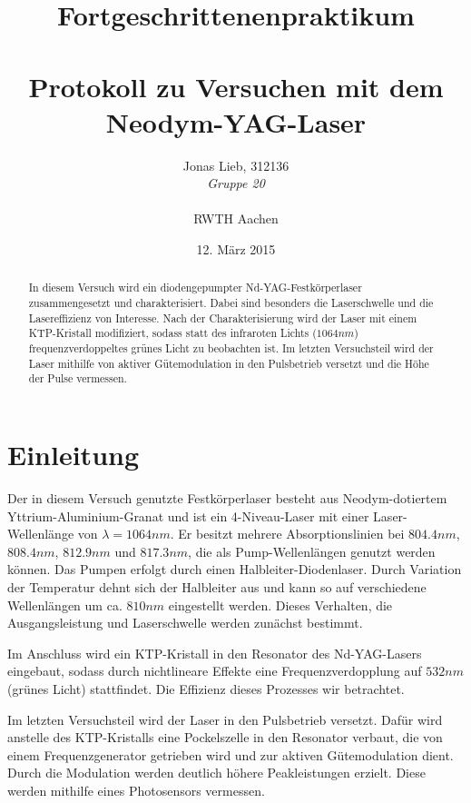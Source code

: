 \documentclass{../Misc/MontavonLaTeX/Montavon}
\date{12. März 2015}
\begin{document}
\title{Fortgeschrittenenpraktikum \\ \quad \\ Protokoll zu Versuchen mit dem Neodym-YAG-Laser}
\author{Jonas Lieb, 312136 \\ \emph{Gruppe 20} \\ \\  RWTH Aachen}
\maketitle

\begin{abstract}
In diesem Versuch wird ein diodengepumpter Nd-YAG-Festkörperlaser zusammengesetzt und charakterisiert. Dabei sind besonders die Laserschwelle und die Lasereffizienz von Interesse. Nach der Charakterisierung wird der Laser mit einem KTP-Kristall modifiziert, sodass statt des infraroten Lichts ($1064 \unit{nm}$) frequenzverdoppeltes grünes Licht zu beobachten ist. Im letzten Versuchsteil wird der Laser mithilfe von aktiver Gütemodulation in den Pulsbetrieb versetzt und die Höhe der Pulse vermessen.
\end{abstract}
\newpage

\setcounter{tocdepth}{2}
\tableofcontents
\newpage

\section{Einleitung}
Der in diesem Versuch genutzte Festkörperlaser besteht aus Neodym-dotiertem Yttrium-Aluminium-Granat und ist ein 4-Niveau-Laser mit einer Laser-Wellenlänge von $\lambda = 1064 \unit{nm}$. Er besitzt mehrere Absorptionslinien bei $804.4 \unit{nm}$, $808.4 \unit{nm}$, $812.9 \unit{nm}$ und $817.3 \unit{nm}$, die als Pump-Wellenlängen genutzt werden können.
Das Pumpen erfolgt durch einen Halbleiter-Diodenlaser. Durch Variation der Temperatur dehnt sich der Halbleiter aus und kann so auf verschiedene Wellenlängen um ca. $810 \unit{nm}$ eingestellt werden. Dieses Verhalten, die Ausgangsleistung und Laserschwelle werden zunächst bestimmt.

Im Anschluss wird ein KTP-Kristall in den Resonator des Nd-YAG-Lasers eingebaut, sodass durch nichtlineare Effekte eine Frequenzverdopplung auf $532 \unit{nm}$ (grünes Licht) stattfindet. Die Effizienz dieses Prozesses wir betrachtet.

Im letzten Versuchsteil wird der Laser in den Pulsbetrieb versetzt. Dafür wird anstelle des KTP-Kristalls eine Pockelszelle in den Resonator verbaut, die von einem Frequenzgenerator getrieben wird und zur aktiven Gütemodulation dient. Durch die Modulation werden deutlich höhere Peakleistungen erzielt. Diese werden mithilfe eines Photosensors vermessen.
\end{document}
